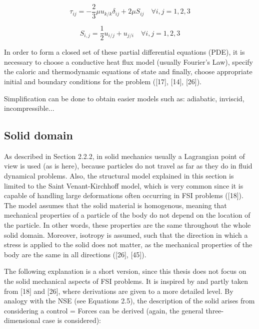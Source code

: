\begin{equation}
	\tau_{ij} = -\frac{2}{3}\mu u_{k/k} \delta_{ij}+2\mu S_{ij} \quad \forall i,j = 1,2,3
\end{equation}



\begin{equation}
	S_{i,j} = \frac{1}{2}u_{i/j}+u_{j/i} \quad \forall i,j = 1,2,3
\end{equation}

In order to form a closed set of these partial differential equations (PDE), it is necessary to choose a
conductive heat flux model (usually Fourier’s Law), specify the caloric and thermodynamic equations of
state and finally, choose appropriate initial and boundary conditions for the problem ([17], [14], [26]).

Simplification can be done to obtain easier models such as: adiabatic, inviscid, incompressible...


\subsection{Solid domain}

As described in Section 2.2.2, in solid mechanics usually a Lagrangian point of view is used (as is here),
because particles do not travel as far as they do in fluid dynamical problems. Also, the structural model
explained in this section is limited to the Saint Venant-Kirchhoff model, which is very common since
it is capable of handling large deformations often occurring in FSI problems ([18]). The model assumes
that the solid material is homogenous, meaning that mechanical properties of a particle of the body do
not depend on the location of the particle. In other words, these properties are the same throughout the
whole solid domain. Moreover, isotropy is assumed, such that the direction in which a stress is applied
to the solid does not matter, as the mechanical properties of the body are the same in all directions ([26],
[45]).

The following explanation is a short version, since this thesis does not focus on the solid mechanical
aspects of FSI problems. It is inspired by and partly taken from [18] and [26], where derivations are given
to a more detailed level.
By analogy with the NSE (see Equations 2.5), the description of the solid arises from considering a control
= Forces can be derived (again, the general three-dimensional case is considered):

